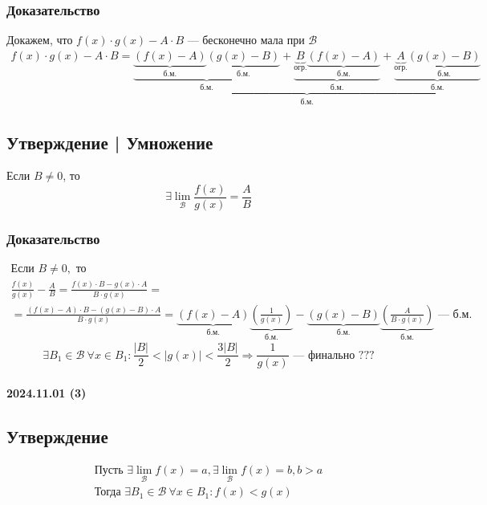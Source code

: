 \documentclass{article}
\begin{document}
\subsubsection{Доказательство}
Докажем, что $f(x) \cdot g(x) - A \cdot B$ --- бесконечно мала при $\mathcal{B}$
\begin{gather*}
    f(x) \cdot g(x) - A \cdot B = 
    \underbrace{\underbrace{\underbrace{(f(x) - A)}_{\text{б.м.}} \underbrace{(g(x) - B)}_{\text{б.м.}}}_{\text{б.м.}} + 
    \underbrace{\underbrace{B}_{\text{огр.}} \underbrace{(f(x) - A)}_{\text{б.м.}}}_{\text{б.м.}} + 
    \underbrace{\underbrace{A}_{\text{огр.}} \underbrace{(g(x) - B)}_{\text{б.м.}}}_{\text{б.м.}}}_{\text{б.м.}}
\end{gather*}


\subsection{Утверждение | Умножение}
Если $B \neq 0$, то 
\[
    \exists \lim_{\mathcal{B}} \frac{f(x)}{g(x)} = \frac{A}{B}
\]

\subsubsection{Доказательство}
\begin{gather*}
    \text{Если } B \neq 0, \text{ то} \\
    \frac{f(x)}{g(x)} - \frac{A}{B} = 
    \frac{f(x) \cdot B - g(x) \cdot A}{B \cdot g(x)} = \\
    = \frac{(f(x) - A) \cdot B - (g(x) - B) \cdot A}{B \cdot g(x)} =
    \underbrace{(f(x) - A)}_{\text{б.м.}} \underbrace{\left( \frac{1}{g(x)} \right)}_{\text{б.м.}} - 
    \underbrace{(g(x) - B)}_{\text{б.м.}} \underbrace{\left( \frac{A}{B \cdot g(x)} \right)}_{\text{б.м.}} \text{ --- б.м.}
\end{gather*}
\[
\exists B_1 \in \mathcal{B}~\forall x \in B_1: \frac{|B|}{2} < |g(x)| < \frac{3|B|}{2} \Rightarrow \frac{1}{g(x)} \text{ --- финально ???}
\]


\paragraph{2024.11.01 (3)}
\subsection{Утверждение}
\begin{gather*}
    \text{Пусть } \exists \lim_{\mathcal{B}} f(x) = a, \exists \lim_{\mathcal{B}} f(x) = b, b > a \\
    \text{Тогда } \exists B_1 \in \mathcal{B} ~ \forall x \in B_1: f(x) < g(x)
\end{gather*}
\end{document}
